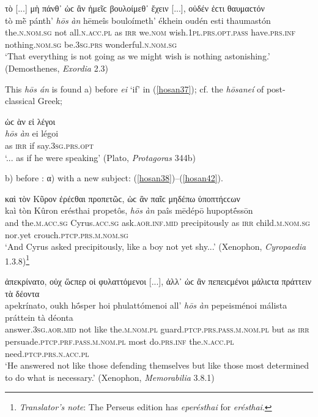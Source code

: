 \begin{exe}
\ex τὸ {[}...{]} μὴ πάνθ᾽ ὡϲ ἂν ἡμεῖϲ βουλοίμεθ᾽
ἔχειν {[}...{]}, οὐδέν ἐϲτι θαυμαϲτόν\\
\gll tò mḕ pánth' \emph{hōs} \emph{àn} hēmeîs bouloímeth' ékhein oudén esti thaumastón\\
the.\textsc{n.nom.sg} not all.\textsc{n.acc.pl} as \textsc{irr} we.\textsc{nom} wish.\textsc{1pl.prs.opt.pass} have.\textsc{prs.inf} nothing.\textsc{nom.sg} be.\textsc{3sg.prs} wonderful.\textsc{n.nom.sg}\\
\trans `That everything is not going as we might wish is nothing astonishing.' (Demosthenes, \textit{Exordia} 2.3)
\label{hosan36}
\end{exe}

This \emph{hōs án} is found a) before \emph{ei} `if' in (\ref{hosan37}); cf. the \emph{hōsaneí} of post-classical Greek; 

\begin{exe}
\ex ὡϲ ὰν εἰ λέγοι\\
\gll \emph{hōs} \emph{àn} ei légoi\\
as \textsc{irr} if say.\textsc{3sg.prs.opt}\\
\trans `... as if he were speaking' (Plato, \textit{Protagoras} 344b)
\label{hosan37}
\end{exe}

b) before : α) with a new subject: (\ref{hosan38})--(\ref{hosan42}).

\begin{exe}
\ex καὶ τὸν Κῦρον ἐρέϲθαι προπετῶϲ, ὡϲ ἂν παῖϲ μηδέπω ὑποπτήϲϲων\\
\gll kaì tòn Kûron erésthai propetôs, \emph{hōs} \emph{àn} paîs mēdépō hupoptḗssōn\\
and the.\textsc{m.acc.sg} Cyrus.\textsc{acc.sg} ask.\textsc{aor.inf.mid} precipitously as \textsc{irr} child.\textsc{m.nom.sg} nor.yet crouch.\textsc{ptcp.prs.m.nom.sg}\\
\trans `And Cyrus asked precipitously, like a boy not yet shy...' (Xenophon, \textit{Cyropaedia} 1.3.8)\footnote{\emph{Translator's note}: The Perseus edition has \textit{eperésthai} for \textit{erésthai}.}
\label{hosan38}
\end{exe}

\begin{exe}
\ex ἀπεκρίνατο, οὐχ ὥϲπερ οἱ φυλαττόμενοι {[}...{]}, ἀλλ᾽ ὡϲ ἂν πεπειϲμένοι μάλιϲτα πράττειν τὰ δέοντα\\
\gll apekrínato, oukh hṓsper hoi phulattómenoi all' \emph{hōs} \emph{àn} pepeisménoi málista práttein tà déonta\\
answer.\textsc{3sg.aor.mid} not like the.\textsc{m.nom.pl} guard.\textsc{ptcp.prs.pass.m.nom.pl} but as \textsc{irr} 
persuade.\textsc{ptcp.prf.pass.m.nom.pl} most do.\textsc{prs.inf} the.\textsc{n.acc.pl} need.\textsc{ptcp.prs.n.acc.pl}\\
\trans `He answered not like those defending themselves but like those most determined to do what is necessary.' (Xenophon, \textit{Memorabilia} 3.8.1)
\label{hosan39}
\end{exe}


